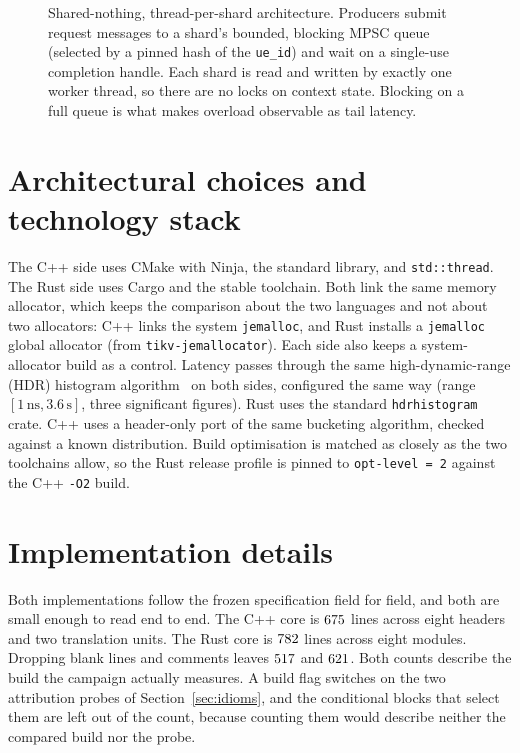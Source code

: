 \documentclass[english,oneside,a4paper,censored,csm,software-track-2020]{HYthesisML}
\begin{document}
\begin{figure}[ht]
\caption[Shared-nothing, thread-per-shard architecture]{Shared-nothing, thread-per-shard architecture. Producers submit request messages to a
shard's bounded, blocking MPSC queue (selected by a pinned hash of the \texttt{ue\_id}) and wait
on a single-use completion handle. Each shard is read and written by exactly one worker thread,
so there are no locks on context state. Blocking on a full queue is what makes overload
observable as tail latency.\label{fig:arch}}
\end{figure}

\section{Architectural choices and technology stack}
The C++ side uses CMake with Ninja, the standard library, and \texttt{std::thread}. The Rust
side uses Cargo and the stable toolchain. Both link the same memory allocator, which keeps the
comparison about the two languages and not about two allocators: C++ links the system
\texttt{jemalloc}, and Rust installs a \texttt{jemalloc} global allocator (from
\texttt{tikv-jemallocator}). Each side also keeps a system-allocator build as a control.
Latency passes through the same high-dynamic-range (HDR) histogram
algorithm~\cite{tene_hdrhistogram} on both sides, configured the same way (range
$[1\,\text{ns}, 3.6\,\text{s}]$, three significant figures). Rust uses the standard
\texttt{hdrhistogram} crate. C++ uses a header-only port of the same bucketing algorithm,
checked against a known distribution. Build optimisation is matched as closely as the two
toolchains allow, so the Rust release profile is pinned to \texttt{opt-level~=~2} against the
C++ \texttt{-O2} build.

\section{Implementation details}\label{sec:impldetails}
\label{sec:impl}
Both implementations follow the frozen specification field for field, and both are small
enough to read end to end. The C++ core is $675$ lines across eight headers and two
translation units. The Rust core is $782$ lines across eight modules. Dropping blank
lines and comments leaves $517$ and $621$. Both counts describe the build the
campaign actually measures. A build flag switches on the two attribution probes of
Section~\ref{sec:idioms}, and the conditional blocks that select them are left out of the count,
because counting them would describe neither the compared build nor the probe.
\end{document}
